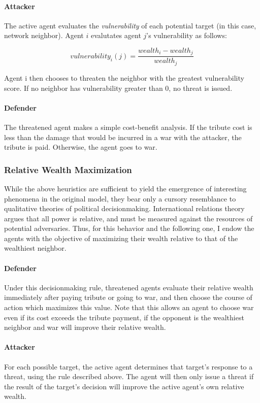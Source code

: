 \documentclass{article}
\begin{document}
\paragraph{Attacker}
The active agent evaluates the \emph{vulnerability} of each potential target (in this case, network neighbor). Agent $i$ evalutates agent $j$'s vulnerability as follows:

\[
vulnerability_{i}(j)=\frac{wealth_i - wealth_j}{wealth_j}
\]

Agent i then chooses to threaten the neighbor with the greatest vulnerability score. If no neighbor has vulnerability greater than 0, no threat is issued.

\paragraph{Defender}
The threatened agent makes a simple cost-benefit analysis. If the tribute cost is less than the damage that would be incurred in a war with the attacker, the tribute is paid. Otherwise, the agent goes to war. 

\subsubsection{Relative Wealth Maximization}

While the above heuristics are sufficient to yield the emergrence of interesting phenomena in the original model, they bear only a cursory resemblance to qualitative theories of political decisionmaking. International relations theory argues that all power is relative, and must be measured against the resources of potential adversaries. Thus, for this behavior and the following one, I endow the agents with the objective of maximizing their wealth relative to that of the wealthiest neighbor. 

\paragraph{Defender}
Under this decisionmaking rule, threatened agents evaluate their relative wealth immediately after paying tribute or going to war, and then choose the course of action which maximizes this value. Note that this allows an agent to choose war even if its cost exceeds the tribute payment, if the opponent is the wealthiest neighbor and war will improve their relative wealth.

\paragraph{Attacker}
For each possible target, the active agent determines that target's response to a threat, using the rule described above. The agent will then only issue a threat if the result of the target's decision will improve the active agent's own relative wealth.
\end{document}
